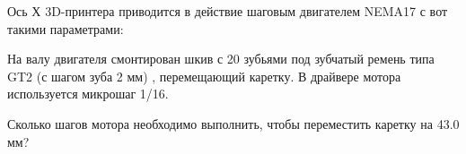 

Ось Х 3D-принтера приводится в действие шаговым двигателем NEMA17  с вот такими параметрами:


На валу двигателя смонтирован шкив с 20 зубьями под зубчатый ремень типа GT2 (с шагом зуба 2 мм) ,  перемещающий каретку.   В драйвере мотора используется микрошаг 1/16.

Сколько шагов мотора необходимо выполнить, чтобы переместить каретку на 43.0 мм?